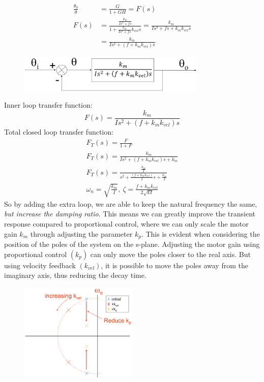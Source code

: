 \documentclass[class=report, crop=false, 12pt,a4paper]{standalone}
\begin{document}
\begin{align}
  \frac{\theta_0}{\theta} &= \frac{G}{1 +GH} = F(s)\\
  F(s) &= \frac{\frac{k_m}{Is^2 + fs}}{1 + \frac{k_m}{Is^2 + fs}k_{vel} s} = \frac{k_m}{Is^2 + fs + k_m k_{vel}s}\\
  &= \frac{k_m}{Is^2 + \left(f + k_m k_{vel}\right) s}
\end{align}
\begin{figure}[H]
  \centerline{\includegraphics[width = 0.8\textwidth]{../img/diagram112.png}}
  \caption{}
\end{figure}
Inner loop transfer function:
\begin{equation}
  F(s) = \frac{k_m}{Is^2 + \left(f + k_m k_{vel}\right) s}
\end{equation}
Total closed loop transfer function:
\begin{gather}
  F_T(s) = \frac{F}{1 + F}\\
  F_T(s) = \frac{k_m}{Is^2 + (f+k_m k_{vel})s + k_m}\\
  F_T(s) = \frac{\frac{k_m}{I}}{s^2 + \frac{\left(f + k_m k_{vel}\right)}{I} s + \frac{k_m}{I}}\\
  \omega_n = \sqrt{\frac{k_m}{I}}, \ \zeta = \frac{f + k_m k_{vel}}{2 \sqrt{kI}}
\end{gather}
So by adding the extra loop, we are able to keep the natural frequency the same, \textit{but increase the damping ratio}. This means we can greatly improve the transient response compared to proportional control, where we can only scale the motor gain $k_m$ through adjusting the parameter $k_p$. This is evident when considering the position of the poles of the system on the s-plane. Adjusting the motor gain using proportional control $\left( k_p\right)$ can only move the poles closer to the real axis. But using velocity feedback $\left( k_{vel}\right)$, it is possible to move the poles away from the imaginary axis, thus reducing the decay time. 
\begin{figure}[H]
  \centerline{\includegraphics[width = 0.5\textwidth]{../img/diagram113.png}}
  \caption{}
\end{figure}
\end{document}
